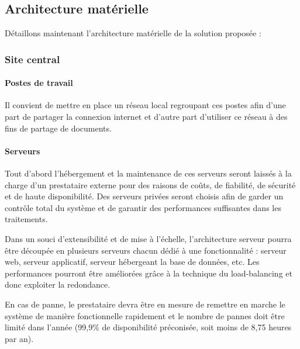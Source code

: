 \documentclass[a4paper]{article}
\begin{document}
\subsection{Architecture matérielle}

Détaillons maintenant l'architecture matérielle de la solution proposée :

\subsubsection{Site central}

\paragraph{Postes de travail} Il convient de mettre en place un réseau local regroupant ces postes afin d'une part de partager la connexion internet et d'autre part d'utiliser ce réseau à des fins de partage de documents.

\paragraph{Serveurs}

Tout d'abord l'hébergement et la maintenance de ces serveurs seront laissés à la charge d'un prestataire externe pour des raisons de coûts, de fiabilité, de sécurité et de haute disponibilité. Des serveurs privées seront choisis afin de garder un contrôle total du système et de garantir des performances suffisantes dans les traitements.

Dans un souci d'extensibilité et de mise à l'échelle, l'architecture serveur pourra être découpée en plusieurs serveurs chacun dédié à une fonctionnalité : serveur web, serveur applicatif, serveur hébergeant la base de données, etc. Les performances pourront être améliorées grâce à la technique du load-balancing et donc exploiter la redondance.

En cas de panne, le prestataire devra être en mesure de remettre en marche le système de manière fonctionnelle rapidement et le nombre de pannes doit être limité dans l'année (99,9\% de disponibilité préconisée, soit moins de 8,75 heures par an).
\end{document}
